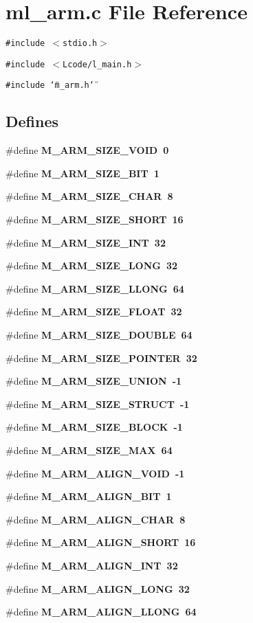\section{ml\_\-arm.c File Reference}
\label{ml__arm_8c}
{\tt \#include $<$stdio.h$>$}\par
{\tt \#include $<$Lcode/l\_\-main.h$>$}\par
{\tt \#include \char`\"{}m\_\-arm.h\char`\"{}}\par
\subsection*{Defines}
\begin{CompactItemize}
\item 
\#define \bf{M\_\-ARM\_\-SIZE\_\-VOID}~0
\item 
\#define \bf{M\_\-ARM\_\-SIZE\_\-BIT}~1
\item 
\#define \bf{M\_\-ARM\_\-SIZE\_\-CHAR}~8
\item 
\#define \bf{M\_\-ARM\_\-SIZE\_\-SHORT}~16
\item 
\#define \bf{M\_\-ARM\_\-SIZE\_\-INT}~32
\item 
\#define \bf{M\_\-ARM\_\-SIZE\_\-LONG}~32
\item 
\#define \bf{M\_\-ARM\_\-SIZE\_\-LLONG}~64
\item 
\#define \bf{M\_\-ARM\_\-SIZE\_\-FLOAT}~32
\item 
\#define \bf{M\_\-ARM\_\-SIZE\_\-DOUBLE}~64
\item 
\#define \bf{M\_\-ARM\_\-SIZE\_\-POINTER}~32
\item 
\#define \bf{M\_\-ARM\_\-SIZE\_\-UNION}~-1
\item 
\#define \bf{M\_\-ARM\_\-SIZE\_\-STRUCT}~-1
\item 
\#define \bf{M\_\-ARM\_\-SIZE\_\-BLOCK}~-1
\item 
\#define \bf{M\_\-ARM\_\-SIZE\_\-MAX}~64
\item 
\#define \bf{M\_\-ARM\_\-ALIGN\_\-VOID}~-1
\item 
\#define \bf{M\_\-ARM\_\-ALIGN\_\-BIT}~1
\item 
\#define \bf{M\_\-ARM\_\-ALIGN\_\-CHAR}~8
\item 
\#define \bf{M\_\-ARM\_\-ALIGN\_\-SHORT}~16
\item 
\#define \bf{M\_\-ARM\_\-ALIGN\_\-INT}~32
\item 
\#define \bf{M\_\-ARM\_\-ALIGN\_\-LONG}~32
\item 
\#define \bf{M\_\-ARM\_\-ALIGN\_\-LLONG}~64

\end{CompactItemize}
